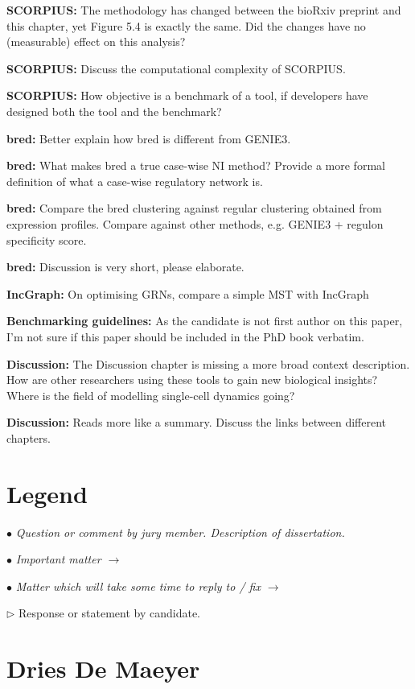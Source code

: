 \documentclass[10pt]{article}
\newcommand{\exam}[2][\  ]{\hspace{0pt}\marginpar{\color{red}#1}$\bullet$ \textit{#2}}
\newcommand{\imp}[1]{{\color{red} #1}}
\newcommand{\nimp}[1]{{\color{gray} #1}}
\newcommand{\answ}[1]{{\color{blue} $\triangleright$ #1}}
\newcommand{\bigexclaim}{\raisebox{-0.1em}{\BigTriangleUp}\hspace{-0.32em}\llap{\small\textbf{!}}\hspace{0.32em}}
\newcommand{\tagimp}{\bigexclaim}
\newcommand{\tagtime}{{\Large $\hourglass$}}
\begin{document}
{\textbf{SCORPIUS:} {The methodology has changed between the bioRxiv preprint and this chapter, yet Figure 5.4 is exactly the same. Did the changes have no (measurable) effect on this analysis?}

\textbf{SCORPIUS:} {Discuss the computational complexity of SCORPIUS.}

\textbf{SCORPIUS:} How objective is a benchmark of a tool, if developers have designed both the tool and the benchmark?

\textbf{bred:} {Better explain how bred is different from GENIE3.}

\textbf{bred:} {What makes bred a true case-wise NI method? Provide a more formal definition of what a case-wise regulatory network is.}

\textbf{bred:} {Compare the bred clustering against regular clustering obtained from expression profiles. Compare against other methods, e.g. GENIE3 + regulon specificity score.}

\textbf{bred:} {Discussion is very short, please elaborate.}

\textbf{IncGraph:} {On optimising GRNs, compare a simple MST with IncGraph}

\textbf{Benchmarking guidelines:} {As the candidate is not first author on this paper, I’m not sure if this paper
	should be included in the PhD book verbatim.}

\textbf{Discussion:} {The Discussion chapter is missing a more broad context
			description. How are other researchers using these tools to gain new biological insights? Where is the field of modelling single-cell dynamics going?}
		
\textbf{Discussion:} {Reads more like a summary. Discuss the links between different chapters.}

\newpage
\section{Legend}
\exam{Question or comment by jury member. \nimp{Description of dissertation.}}

\exam[\tagimp]{\imp{Important matter} $\rightarrow$}

\exam[\tagtime]{Matter which will take some time to reply to / fix $\rightarrow$}

\answ{Response or statement by candidate.}

\section{Dries De Maeyer}

}
\end{document}
